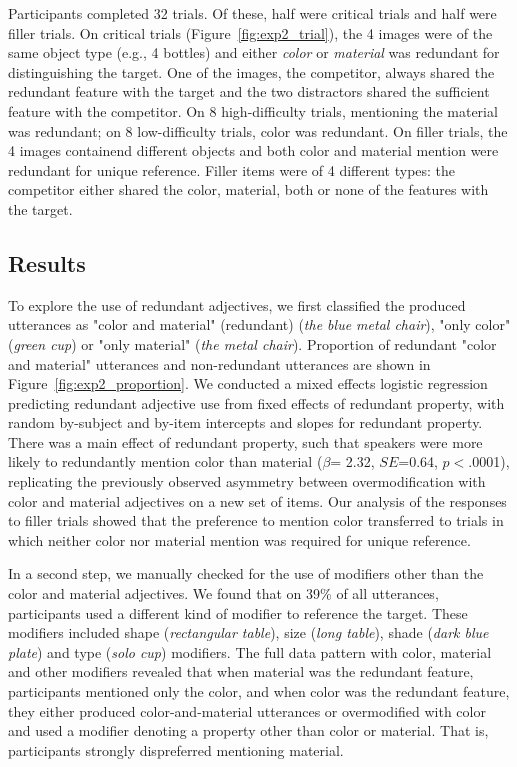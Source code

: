 \documentclass[12pt,letterpaper]{article}
\begin{document}
Participants completed 32 trials. Of these, half were critical trials and half were filler trials. On critical trials (Figure~\ref{fig:exp2_trial}), the 4 images were of the same object type (e.g., 4 bottles) and either \textit{color} or \textit{material} was redundant for distinguishing the target. One of the images, the competitor, always shared the redundant feature with the target and the two distractors shared the sufficient feature with the competitor. On 8 high-difficulty trials, mentioning the material was redundant; on 8 low-difficulty trials, color was redundant. On filler trials, the 4 images containend different objects and both color and material mention were redundant for unique reference. Filler items were of 4 different types: the competitor either shared the color, material, both or none of the features with the target. 

\subsection{Results}

To explore the use of redundant adjectives, we first classified the produced utterances as "color and material" (redundant) (\textit{the blue metal chair}), "only color" (\textit{green cup}) or "only material" (\textit{the metal chair}). Proportion of redundant "color and material" utterances and non-redundant utterances are shown in Figure~\ref{fig:exp2_proportion}. We conducted a mixed effects logistic regression predicting redundant adjective use from fixed effects of redundant property, with random by-subject and by-item intercepts and slopes for redundant property. There was a main effect of redundant property, such that speakers were more likely to redundantly mention color than material ($\beta$= 2.32, $SE$=0.64, $p$$<$.0001), replicating the previously observed asymmetry between overmodification with color and material adjectives on a new set of items. Our analysis of the responses to filler trials showed that the preference to mention color transferred to trials in which neither color nor material mention was required for unique reference. 

In a second step, we manually checked for the use of modifiers other than the color and material adjectives. We found that on 39\% of all utterances, participants used a different kind of modifier to reference the target. These modifiers included shape (\textit{rectangular table}), size (\textit{long table}), shade (\textit{dark blue plate}) and type (\textit{solo cup}) modifiers. The full data pattern with color, material and other modifiers revealed that when material was the redundant feature, participants mentioned only the color, and when color was the redundant feature, they either produced color-and-material utterances or overmodified with color and used a modifier denoting a property other than color or material. That is, participants strongly dispreferred mentioning material.
\end{document}
